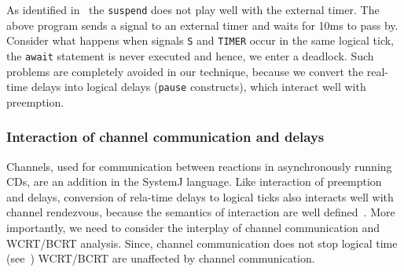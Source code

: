 As identified in~\cite{Bourke2009a} the \texttt{suspend} does not play
well with the external timer. The above program sends a signal to an
external timer and waits for 10ms to pass by. Consider what happens when
signals \texttt{S} and \texttt{TIMER} occur in the same logical tick,
the \texttt{await} statement is never executed and hence, we enter a
deadlock. Such problems are completely avoided in our technique, because
we convert the real-time delays into logical delays (\texttt{pause}
constructs), which interact well with preemption.

\subsubsection{Interaction of channel communication and delays}
\label{sec:inter-chann-comm}

Channels, used for communication between reactions in asynchronously
running CDs, are an addition in the SystemJ language. Like interaction
of preemption and delays, conversion of rela-time delays to logical
ticks also interacts well with channel rendezvous, because the semantics
of interaction are well defined~\cite{amal10}. More importantly, we need
to consider the interplay of channel communication and WCRT/BCRT
analysis. Since, channel communication does not stop logical time
(see~\cite{amal10}) WCRT/BCRT are unaffected by channel
communication. %


